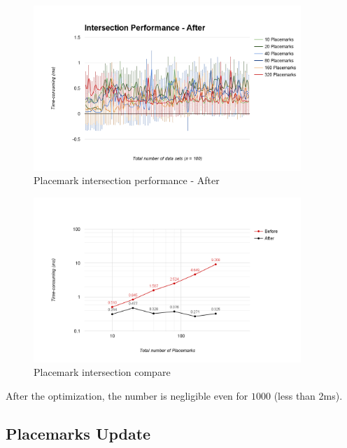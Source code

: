 \begin{figure}[H]
	\caption{Placemark intersection performance - After}
	\label{fig:placemark-intersection-performance-after}
	\centering
	\includegraphics[width=0.9\textwidth, keepaspectratio]{Figures/placemark-intersection-performance-after.png}
	\decoRule
\end{figure}

\begin{figure}[H]
	\caption{Placemark intersection compare}
	\label{fig:placemark-intersection-compare}
	\centering
	\includegraphics[width=0.9\textwidth, keepaspectratio]{Figures/placemark-intersection-compare.png}
	\decoRule
\end{figure}

After the optimization, the number is negligible even for $1000$  (less than 2ms).

\subsection{Placemarks Update}
\label{section:placemarks-update}

